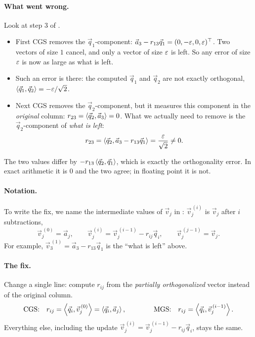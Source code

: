 \paragraph{What went wrong.} Look at step 3 of .
\begin{itemize}
  \item First CGS removes the $\vec{q}_1$-component: $\vec{a}_3 - r_{13}\vec{q}_1 = (0, -\varepsilon, 0, \varepsilon)^\top$. Two vectors of size $1$ cancel, and only a vector of size $\varepsilon$ is left. So any error of size $\varepsilon$ is now as large as what is left.
  \item Such an error is there: the computed $\vec{q}_1$ and $\vec{q}_2$ are not exactly orthogonal, $\left\langle \vec{q}_1, \vec{q}_2 \right\rangle = -\varepsilon/\sqrt{2}$.
  \item Next CGS removes the $\vec{q}_2$-component, but it measures this component in the \emph{original} column: $r_{23} = \left\langle \vec{q}_2, \vec{a}_3 \right\rangle = 0$. What we actually need to remove is the $\vec{q}_2$-component of \emph{what is left}:
  \begin{equation}
    r_{23} = \left\langle \vec{q}_2, \vec{a}_3 - r_{13}\vec{q}_1 \right\rangle = \frac{\varepsilon}{\sqrt{2}} \ne 0.
  \end{equation}
\end{itemize}
The two values differ by $-r_{13}\left\langle \vec{q}_2, \vec{q}_1 \right\rangle$, which is exactly the orthogonality error. In exact arithmetic it is $0$ and the two agree; in floating point it is not.

\paragraph{Notation.} To write the fix, we name the intermediate values of $\vec{v}_j$ in : $\vec{v}_j^{\,(i)}$ is $\vec{v}_j$ after $i$ subtractions,
\begin{equation}
  \vec{v}_j^{\,(0)} = \vec{a}_j, \qquad \vec{v}_j^{\,(i)} = \vec{v}_j^{\,(i-1)} - r_{ij}\vec{q}_i, \qquad \vec{v}_j^{\,(j-1)} = \vec{v}_j. \label{eq:gs-partial}
\end{equation}
For example, $\vec{v}_3^{\,(1)} = \vec{a}_3 - r_{13}\vec{q}_1$ is the ``what is left'' above.

\paragraph{The fix.} Change a single line: compute $r_{ij}$ from the \emph{partially orthogonalized} vector instead of the original column.
\begin{equation}
  \text{CGS:}\quad r_{ij} = \left\langle \vec{q}_i, \vec{v}_j^{\,(0)} \right\rangle = \left\langle \vec{q}_i, \vec{a}_j \right\rangle, \qquad\qquad
  \text{MGS:}\quad r_{ij} = \left\langle \vec{q}_i, \vec{v}_j^{\,(i-1)} \right\rangle.
\end{equation}
Everything else, including the update $\vec{v}_j^{\,(i)} = \vec{v}_j^{\,(i-1)} - r_{ij}\vec{q}_i$, stays the same.

